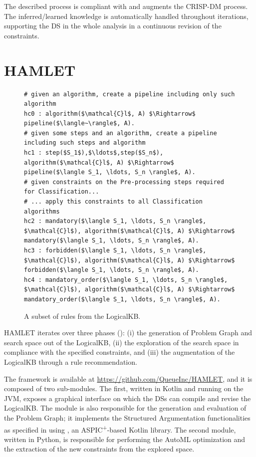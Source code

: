 The described process is compliant with and augments the CRISP-DM process.
The inferred/learned knowledge is automatically handled throughout iterations, supporting the DS in the whole analysis in a continuous revision of the constraints.
\vspace{2cm}

\section{HAMLET}\label{hamlet-sec:implementation}

\begin{figure}[t]
\begin{lstlisting}[mathescape=true]
# given an algorithm, create a pipeline including only such algorithm
hc0 : algorithm($\mathcal{C}l$, A) $\Rightarrow$ pipeline($\langle~\rangle$, A).
# given some steps and an algorithm, create a pipeline including such steps and algorithm
hc1 : step($S_1$),$\ldots$,step($S_n$), algorithm($\mathcal{C}l$, A) $\Rightarrow$ pipeline($\langle S_1, \ldots, S_n \rangle$, A).
# given constraints on the Pre-processing steps required for Classification...
# ... apply this constraints to all Classification algorithms
hc2 : mandatory($\langle S_1, \ldots, S_n \rangle$, $\mathcal{C}l$), algorithm($\mathcal{C}l$, A) $\Rightarrow$ mandatory($\langle S_1, \ldots, S_n \rangle$, A).
hc3 : forbidden($\langle S_1, \ldots, S_n \rangle$, $\mathcal{C}l$), algorithm($\mathcal{C}l$, A) $\Rightarrow$ forbidden($\langle S_1, \ldots, S_n \rangle$, A).
hc4 : mandatory_order($\langle S_1, \ldots, S_n \rangle$, $\mathcal{C}l$), algorithm($\mathcal{C}l$, A) $\Rightarrow$ mandatory_order($\langle S_1, \ldots, S_n \rangle$, A).
\end{lstlisting}
\caption{A subset of rules from the LogicalKB.}
\label{rules-arg2p}
\end{figure}

HAMLET iterates over three phases (): (i) the generation of Problem Graph and search space out of the LogicalKB, (ii) the exploration of the search space in compliance with the specified constraints, and (iii) the augmentation of the LogicalKB through a rule recommendation.

The framework is available at \url{https://github.com/QueueInc/HAMLET}, and it is composed of two sub-modules. 
The first, written in Kotlin and running on the JVM, exposes a graphical interface on which the DSs can compile and revise the LogicalKB. 
The module is also responsible for the generation and evaluation of the Problem Graph; it implements the Structured Argumentation functionalities as specified in  using \argtup{} \cite{arg2p-jlc}, an ASPIC\textsuperscript{+}-based Kotlin library.
The second module, written in Python, is responsible for performing the AutoML optimization and the extraction of the new constraints from the explored space.

